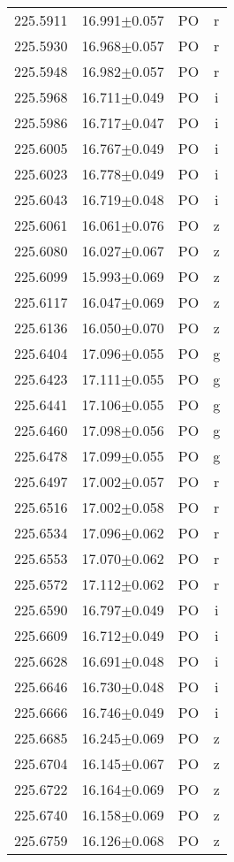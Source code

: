 \begin{table}
\begin{tabular}{cccc}
225.5911 & 16.991$\pm$0.057 & PO & r \\
225.5930 & 16.968$\pm$0.057 & PO & r \\
225.5948 & 16.982$\pm$0.057 & PO & r \\
225.5968 & 16.711$\pm$0.049 & PO & i \\
225.5986 & 16.717$\pm$0.047 & PO & i \\
225.6005 & 16.767$\pm$0.049 & PO & i \\
225.6023 & 16.778$\pm$0.049 & PO & i \\
225.6043 & 16.719$\pm$0.048 & PO & i \\
225.6061 & 16.061$\pm$0.076 & PO & z \\
225.6080 & 16.027$\pm$0.067 & PO & z \\
225.6099 & 15.993$\pm$0.069 & PO & z \\
225.6117 & 16.047$\pm$0.069 & PO & z \\
225.6136 & 16.050$\pm$0.070 & PO & z \\
225.6404 & 17.096$\pm$0.055 & PO & g \\
225.6423 & 17.111$\pm$0.055 & PO & g \\
225.6441 & 17.106$\pm$0.055 & PO & g \\
225.6460 & 17.098$\pm$0.056 & PO & g \\
225.6478 & 17.099$\pm$0.055 & PO & g \\
225.6497 & 17.002$\pm$0.057 & PO & r \\
225.6516 & 17.002$\pm$0.058 & PO & r \\
225.6534 & 17.096$\pm$0.062 & PO & r \\
225.6553 & 17.070$\pm$0.062 & PO & r \\
225.6572 & 17.112$\pm$0.062 & PO & r \\
225.6590 & 16.797$\pm$0.049 & PO & i \\
225.6609 & 16.712$\pm$0.049 & PO & i \\
225.6628 & 16.691$\pm$0.048 & PO & i \\
225.6646 & 16.730$\pm$0.048 & PO & i \\
225.6666 & 16.746$\pm$0.049 & PO & i \\
225.6685 & 16.245$\pm$0.069 & PO & z \\
225.6704 & 16.145$\pm$0.067 & PO & z \\
225.6722 & 16.164$\pm$0.069 & PO & z \\
225.6740 & 16.158$\pm$0.069 & PO & z \\
225.6759 & 16.126$\pm$0.068 & PO & z \\

\end{tabular}
\end{table}
